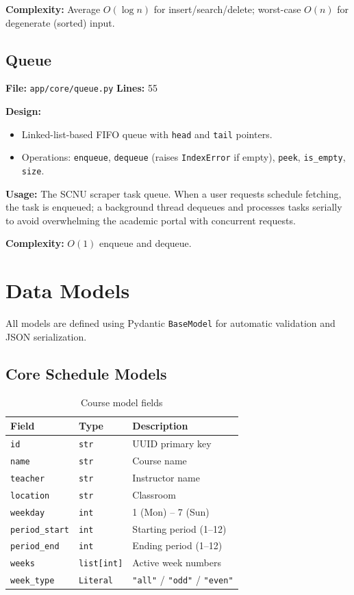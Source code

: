 \documentclass[12pt,a4paper]{article}
\begin{document}
\textbf{Complexity:} Average $O(\log n)$ for insert/search/delete; worst-case $O(n)$ for degenerate (sorted) input.

\subsection{Queue}

\textbf{File:} \texttt{app/core/queue.py} \quad \textbf{Lines:} 55

\textbf{Design:}
\begin{itemize}[nosep]
    \item Linked-list-based FIFO queue with \texttt{head} and \texttt{tail} pointers.
    \item Operations: \texttt{enqueue}, \texttt{dequeue} (raises \texttt{IndexError} if empty), \texttt{peek}, \texttt{is\_empty}, \texttt{size}.
\end{itemize}

\textbf{Usage:} The SCNU scraper task queue. When a user requests schedule fetching, the task is enqueued; a background thread dequeues and processes tasks serially to avoid overwhelming the academic portal with concurrent requests.

\textbf{Complexity:} $O(1)$ enqueue and dequeue.

\section{Data Models}
\label{sec:models}

All models are defined using Pydantic \texttt{BaseModel} for automatic validation and JSON serialization.

\subsection{Core Schedule Models}

\begin{table}[H]
\centering
\caption{Course model fields}
\begin{tabular}{@{}lll@{}}
\toprule
\textbf{Field} & \textbf{Type} & \textbf{Description} \\
\midrule
\texttt{id} & \texttt{str} & UUID primary key \\
\texttt{name} & \texttt{str} & Course name \\
\texttt{teacher} & \texttt{str} & Instructor name \\
\texttt{location} & \texttt{str} & Classroom \\
\texttt{weekday} & \texttt{int} & 1 (Mon) -- 7 (Sun) \\
\texttt{period\_start} & \texttt{int} & Starting period (1--12) \\
\texttt{period\_end} & \texttt{int} & Ending period (1--12) \\
\texttt{weeks} & \texttt{list[int]} & Active week numbers \\
\texttt{week\_type} & \texttt{Literal} & \texttt{"all"} / \texttt{"odd"} / \texttt{"even"} \\
\bottomrule
\end{tabular}
\end{table}
\end{document}
